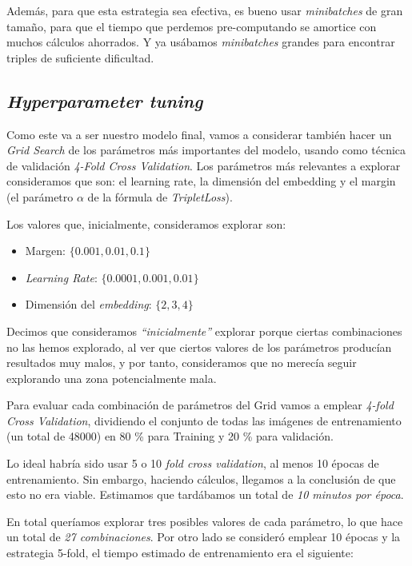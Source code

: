 \documentclass[11pt]{article}
\newcommand{\entrecomillado}[1]{\emph{``#1''}}
\begin{document}
Además, para que esta estrategia sea efectiva, es bueno usar \emph{minibatches} de gran tamaño, para que el tiempo que perdemos pre-computando se amortice con muchos cálculos ahorrados. Y ya usábamos \emph{minibatches} grandes para encontrar triples de suficiente dificultad.

\subsection{\emph{Hyperparameter tuning}} \label{hyperparameter_tuning:seccion}

Como este va a ser nuestro modelo final, vamos a considerar también hacer un \emph{Grid Search} de los parámetros más importantes del modelo, usando como técnica de validación \emph{4-Fold Cross Validation}. Los parámetros más relevantes a explorar consideramos que son: el learning rate, la dimensión del embedding y el margin (el parámetro $\alpha$ de la fórmula de \emph{TripletLoss}).

Los valores que, inicialmente, consideramos explorar son:

\begin{itemize}
  \item Margen: $\{0.001, 0.01, 0.1\}$
  \item \emph{Learning Rate}: $\{0.0001, 0.001, 0.01\}$
  \item Dimensión del \emph{embedding}: $\{2, 3, 4\}$
\end{itemize}

Decimos que consideramos \entrecomillado{inicialmente} explorar porque ciertas combinaciones no las hemos explorado, al ver que ciertos valores de los parámetros producían resultados muy malos, y por tanto, consideramos que no merecía seguir explorando una zona potencialmente mala.

Para evaluar cada combinación de parámetros del Grid vamos a emplear \emph{4-fold Cross Validation}, dividiendo el conjunto de todas las imágenes de entrenamiento (un total de 48000) en 80 \% para Training y 20 \% para validación.

Lo ideal habría sido usar 5 o 10 \emph{fold cross validation}, al menos 10 épocas de entrenamiento. Sin embargo, haciendo cálculos, llegamos a la conclusión de que esto no era viable. Estimamos que tardábamos  un total de \emph{10 minutos por época}.

En total queríamos explorar tres posibles valores de cada parámetro, lo que hace un total de \emph{27 combinaciones}. Por otro lado se consideró emplear 10 épocas y la estrategia 5-fold, el tiempo estimado de entrenamiento era el siguiente:
\end{document}
